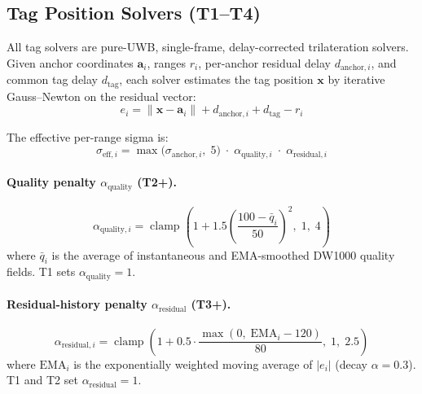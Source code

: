 \documentclass[11pt,a4paper]{article}
\begin{document}
\subsection{Tag Position Solvers (T1--T4)}
\label{app:tag}

All tag solvers are pure-UWB, single-frame, delay-corrected trilateration solvers.
Given anchor coordinates $\mathbf{a}_i$, ranges $r_i$, per-anchor residual delay $d_{\mathrm{anchor},i}$, and common tag delay $d_{\mathrm{tag}}$, each solver estimates the tag position $\mathbf{x}$ by iterative Gauss--Newton on the residual vector:
\begin{equation}
  e_i = \lVert\mathbf{x} - \mathbf{a}_i\rVert + d_{\mathrm{anchor},i} + d_{\mathrm{tag}} - r_i
  \label{eq:tag_residual}
\end{equation}

The effective per-range sigma is:
\begin{equation}
  \sigma_{\mathrm{eff},i} = \max\!\bigl(\sigma_{\mathrm{anchor},i},\; 5\bigr) \;\cdot\; \alpha_{\mathrm{quality},i} \;\cdot\; \alpha_{\mathrm{residual},i}
  \label{eq:sigma_eff}
\end{equation}

\paragraph{Quality penalty $\alpha_{\mathrm{quality}}$ (T2+).}
\begin{equation}
  \alpha_{\mathrm{quality},i} = \operatorname{clamp}\!\left(1 + 1.5 \left(\frac{100 - \bar{q}_i}{50}\right)^{\!2},\; 1,\; 4\right)
\end{equation}
where $\bar{q}_i$ is the average of instantaneous and EMA-smoothed DW1000 quality fields.
T1 sets $\alpha_{\mathrm{quality}} = 1$.

\paragraph{Residual-history penalty $\alpha_{\mathrm{residual}}$ (T3+).}
\begin{equation}
  \alpha_{\mathrm{residual},i} = \operatorname{clamp}\!\left(1 + 0.5 \cdot \frac{\max(0,\; \mathrm{EMA}_i - 120)}{80},\; 1,\; 2.5\right)
\end{equation}
where $\mathrm{EMA}_i$ is the exponentially weighted moving average of $|e_i|$ (decay $\alpha = 0.3$).
T1 and T2 set $\alpha_{\mathrm{residual}} = 1$.
\end{document}
